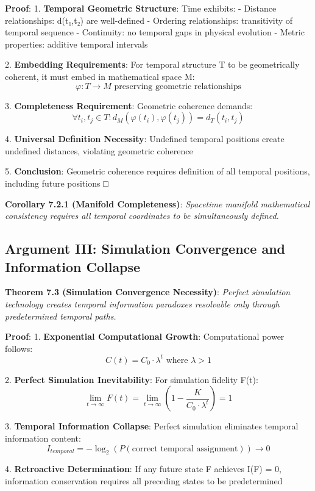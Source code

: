\documentclass[12pt,a4paper]{article}
\theoremstyle{definition}
\begin{document}
{\textbf{Proof}:
1. \textbf{Temporal Geometric Structure}: Time exhibits:
   - Distance relationships: d(t₁,t₂) are well-defined
   - Ordering relationships: transitivity of temporal sequence
   - Continuity: no temporal gaps in physical evolution
   - Metric properties: additive temporal intervals

2. \textbf{Embedding Requirements}: For temporal structure T to be geometrically coherent, it must embed in mathematical space M:
   $$φ: T → M \text{ preserving geometric relationships}$$

3. \textbf{Completeness Requirement}: Geometric coherence demands:
   $$\forall t_i, t_j ∈ T: d_M(φ(t_i), φ(t_j)) = d_T(t_i, t_j)$$

4. \textbf{Universal Definition Necessity}: Undefined temporal positions create undefined distances, violating geometric coherence

5. \textbf{Conclusion}: Geometric coherence requires definition of all temporal positions, including future positions □

\textbf{Corollary 7.2.1 (Manifold Completeness)}: \textit{Spacetime manifold mathematical consistency requires all temporal coordinates to be simultaneously defined.}

\subsection{Argument III: Simulation Convergence and Information Collapse}

\textbf{Theorem 7.3 (Simulation Convergence Necessity)}: \textit{Perfect simulation technology creates temporal information paradoxes resolvable only through predetermined temporal paths.}

\textbf{Proof}:
1. \textbf{Exponential Computational Growth}: Computational power follows:
   $$C(t) = C_0 \cdot \lambda^t \text{ where } \lambda > 1$$

2. \textbf{Perfect Simulation Inevitability}: For simulation fidelity F(t):
   $$\lim_{t \to \infty} F(t) = \lim_{t \to \infty} \left(1 - \frac{K}{C_0 \cdot \lambda^t}\right) = 1$$

3. \textbf{Temporal Information Collapse}: Perfect simulation eliminates temporal information content:
   $$I_{temporal} = -\log_2(P(\text{correct temporal assignment})) \to 0$$

4. \textbf{Retroactive Determination}: If any future state F achieves I(F) = 0, information conservation requires all preceding states to be predetermined

}
\end{document}
